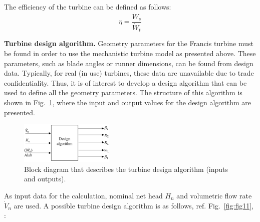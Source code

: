 \documentclass[%
]{USN-PhD}
\begin{document}
The efficiency of the turbine can be defined as follows:
\begin{equation} \label{eq:eq40}
{\eta} = \frac{\dot{W}_{s}}{\dot{W}_{t}}
\end{equation}

\textbf{Turbine design algorithm.} Geometry parameters for the Francis turbine must be found in order to use the mechanistic turbine model as presented above. These parameters, such as blade angles or runner dimensions, can be found from design data. Typically, for real (in use) turbines, these data are unavailable due to trade confidentiality. Thus, it is of interest to develop a design algorithm that can be used to define all the geometry parameters. The structure of this algorithm is shown in Fig.~\ref{fig:fig12}, where the input and output values for the design algorithm are presented.

\begin{figure}
\begin{center}
\includegraphics[width=0.4\textwidth]{fig/Fig_3_Algor_str} %
\caption{Block diagram that describes the turbine design algorithm (inputs and outputs).}
\label{fig:fig12}
\end{center}
\end{figure}

As input data for the calculation, nominal net head $H_n$ and volumetric flow rate $\dot{V}_n$ are used. A possible turbine design algorithm is as follows, ref. Fig.~\ref{fig:fig11}, \cite{Bre:01}:
\end{document}

